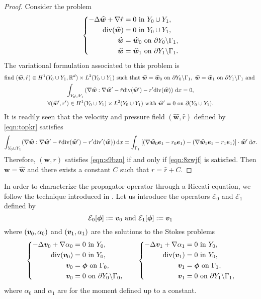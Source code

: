 \documentclass[a4paper,10pt,reqno]{amsart}
\begin{document}
\begin{proof}
    Consider the problem    
    \renewcommand{\w}{\widehat{\bm w}}
    \[
    \left\{\begin{aligned}
            -\Delta \w +\nabla \hat r &= 0 \In Y_0\cup Y_1,\\    
            \div(\w)& = 0 \In Y_0\cup Y_1,\\    
            \w &=  \w_0 \On \partial Y_0\backslash \Gamma_1,\\  
            \w &=  \w_1 \On \partial Y_1 \backslash\Gamma_1.
    \end{aligned}
    \right.
    \] 
    The variational formulation associated to this problem is   
    \begin{multline}
    \text{find }(\w,\hat r)\in H^{1}(Y_0\cup Y_1,\R^{d})\times L^{2}(Y_0\cup Y_1) \text{
    such that }\w=\w_0 \On \partial Y_0\backslash\Gamma_1,\; \w=\w_1 \On \partial
    Y_1\backslash\Gamma_1 \text{ and }\\    
    \int_{Y_0\cup Y_1}\left(\nabla\w:\nabla \w'-\hat r \div(\w') -
    r'\div(\w)\right) \D x =0, \\  \forall (\w',r')\in H^{1}(Y_0\cup Y_1)\times
    L^{2}(Y_0\cup Y_1) \text{ with }\w'=0\On \partial (Y_0\cup Y_1).
    \end{multline} 
    It is readily seen that the velocity and pressure field $(\w,\hat r)$ defined by
    \cref{eqn:topkr} satisfies  
    \[
    \int_{Y_0\cup Y_1}(\nabla\w:\nabla \w'-\hat r\div(\w')-r'\div'(\w))\D x =
    \int_{\Gamma_1}\left[ (\nabla\w_0\e_1-r_0\e_1)-(\nabla \w_1\e_1-r_1\e_1)
    \right]\cdot \w'\D \sigma.
    \] 
    \renewcommand{\w}{{\bm w}}     
    Therefore, $(\w,r)$ satisfies \cref{eqn:s9bzn} if and only if \cref{eqn:8zwjf} is
    satisfied. Then $\w=\hat \w$ and there exists a constant $C$ such that $r=\hat
    r+C$. 
\end{proof}
In order to characterize the propagator operator through a Riccati equation, we
follow the technique introduced in \cite{fliss_dirichlet--neumann_2013}. Let us
introduce the operators $\mathcal{E}_0$ and $\mathcal{E}_1$ defined by  
\begin{equation}
    \label{eqn:2a0sn}\mathcal{E}_0[{\bm \phi}]:={\bm v}_0 \text{ and
    }\mathcal{E}_1[{\bm \phi}]:={\bm v}_1 
\end{equation}
where $({\bm v}_0,\alpha_0)$ and $({\bm v}_1,\alpha_1)$ are the solutions to the Stokes
problems
\[
    \left\{\begin{aligned}
    -\Delta  {\bm v}_0 + \nabla \alpha_0 &= 0 \textrm{ in } Y_0,\\  
    \mathrm{div}({\bm v}_0) &= 0 \textrm{ in } Y_0,\\  
    {\bm v}_0 &= \bm\phi \textrm{ on } \Gamma_0,\\    
    {\bm v}_0 &=  0 \textrm{ on } \partial Y_0\backslash\Gamma_0,
    \end{aligned}
    \right.\qquad 
\left\{\begin{aligned}
    -\Delta  {\bm v}_1 + \nabla \alpha_1 &= 0 \textrm{ in } Y_0,\\  
    \mathrm{div}({\bm v}_1) &= 0 \textrm{ in } Y_0,\\  
    {\bm v}_1 &= \bm\phi \textrm{ on } \Gamma_1,\\    
    {\bm v}_1 &=  0 \textrm{ on } \partial Y_1\backslash\Gamma_1,
    \end{aligned}
    \right.
\] 
where $\alpha_0$ and $\alpha_1$ are for the moment defined up to a constant.


\end{document}
